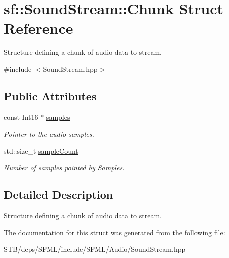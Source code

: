 \hypertarget{structsf_1_1_sound_stream_1_1_chunk}{\section{sf\+:\+:Sound\+Stream\+:\+:Chunk Struct Reference}
\label{structsf_1_1_sound_stream_1_1_chunk}
}


Structure defining a chunk of audio data to stream.  




{\ttfamily \#include $<$Sound\+Stream.\+hpp$>$}

\subsection*{Public Attributes}
\begin{DoxyCompactItemize}
\item 
\hypertarget{structsf_1_1_sound_stream_1_1_chunk_aa3b84d69adbe663a17a7671626076df4}{const Int16 $\ast$ \hyperlink{structsf_1_1_sound_stream_1_1_chunk_aa3b84d69adbe663a17a7671626076df4}{samples}}\label{structsf_1_1_sound_stream_1_1_chunk_aa3b84d69adbe663a17a7671626076df4}

\begin{DoxyCompactList}\small\item\em Pointer to the audio samples. \end{DoxyCompactList}\item 
\hypertarget{structsf_1_1_sound_stream_1_1_chunk_af47f5d94012acf8b11f056ba77aff97a}{std\+::size\+\_\+t \hyperlink{structsf_1_1_sound_stream_1_1_chunk_af47f5d94012acf8b11f056ba77aff97a}{sample\+Count}}\label{structsf_1_1_sound_stream_1_1_chunk_af47f5d94012acf8b11f056ba77aff97a}

\begin{DoxyCompactList}\small\item\em Number of samples pointed by Samples. \end{DoxyCompactList}\end{DoxyCompactItemize}


\subsection{Detailed Description}
Structure defining a chunk of audio data to stream. 

The documentation for this struct was generated from the following file\+:\begin{DoxyCompactItemize}
\item 
S\+T\+B/deps/\+S\+F\+M\+L/include/\+S\+F\+M\+L/\+Audio/Sound\+Stream.\+hpp\end{DoxyCompactItemize}

